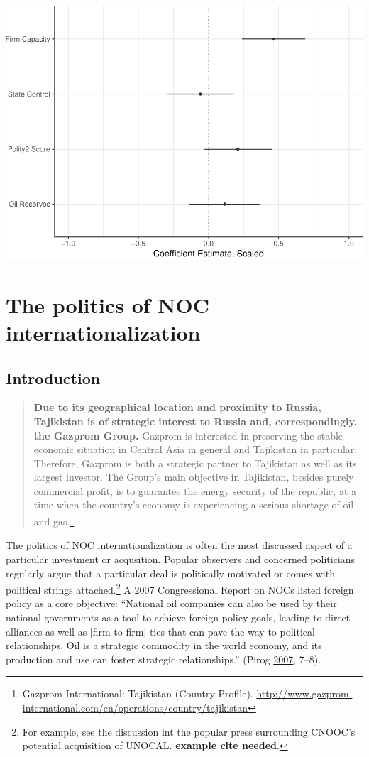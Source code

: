 \documentclass[11pt,]{book}
\begin{document}
\includegraphics{finalfig/basemodelplot-1.pdf}

\hypertarget{paper3}{%
\chapter{The politics of NOC internationalization}\label{paper3}}

\hypertarget{intro03}{%
\section{Introduction}\label{intro03}}

\begin{quote}
\textbf{Due to its geographical location and proximity to Russia, Tajikistan is of strategic interest to Russia and, correspondingly, the Gazprom Group.} Gazprom is interested in preserving the stable economic situation in Central Asia in general and Tajikistan in particular. Therefore, Gazprom is both a strategic partner to Tajikistan as well as its largest investor. The Group's main objective in Tajikistan, besides purely commercial profit, is to guarantee the energy security of the republic, at a time when the country's economy is experiencing a serious shortage of oil and gas.\footnote{Gazprom International: Tajikistan (Country Profile). \url{http://www.gazprom-international.com/en/operations/country/tajikistan}}
\end{quote}

The politics of NOC internationalization is often the most discussed aspect of a particular investment or acqusition. Popular observers and concerned politicians regularly argue that a particular deal is politically motivated or comes with political strings attached.\footnote{For example, see the discussion int the popular press surrounding CNOOC's potential acquisition of UNOCAL. \textbf{example cite needed}.} A 2007 Congressional Report on NOCs listed foreign policy as a core objective: ``National oil companies can also be used by their national governments as a tool to achieve foreign policy goals, leading to direct alliances as well as {[}firm to firm{]} ties that can pave the way to political relationships. Oil is a strategic commodity in the world economy, and its production and use can foster strategic relationships.'' (Pirog \protect\hyperlink{ref-pirog_role_2007}{2007}, 7--8).
\end{document}
